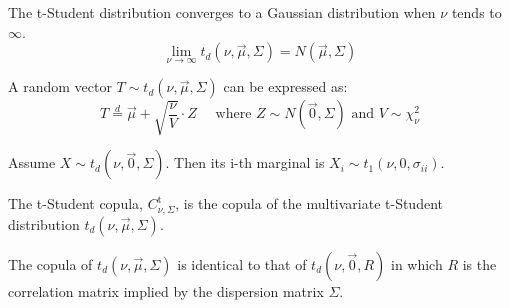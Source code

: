 \documentclass[11pt,fleqn]{book} %
\begin{document}
\begin{proposition}
	The t-Student distribution converges to a Gaussian distribution 
	when $\nu$ tends to $\infty$.
	\begin{displaymath}
		\lim_{\nu \to \infty} t_d(\nu,\vec{\mu},\Sigma) = N(\vec{\mu},\Sigma)
	\end{displaymath}
\end{proposition}

\begin{proposition}
	\label{prop:mtschar}
	A random vector $T \sim t_d(\nu,\vec{\mu},\Sigma)$ can be expressed as:
	\begin{displaymath}
		T \stackrel{d}{=} \vec{\mu} + \sqrt{\frac{\nu}{V}}\cdot Z
		\quad \text{ where } Z \sim N(\vec{0},\Sigma) 
		\text{ and } V \sim \chi_{\nu}^2
	\end{displaymath}
\end{proposition}

\begin{proposition}
	Assume $X \sim t_d(\nu,\vec{0},\Sigma)$. Then its i-th marginal is 
	$X_i \sim t_1(\nu,0,\sigma_{ii})$.
\end{proposition}

\begin{definition}
	The t-Student copula, $C_{\nu,\Sigma}^{\text{t}}$, is the copula of the 
	multivariate t-Student distribution $t_d(\nu,\vec{\mu},\Sigma)$.
\end{definition}

\begin{proposition}
	The copula of $t_d(\nu,\vec{\mu},\Sigma)$ is identical to that of 
	$t_d(\nu,\vec{0},R)$ in which $R$ is the correlation matrix implied by 
	the dispersion matrix $\Sigma$.
\end{proposition}
\end{document}
